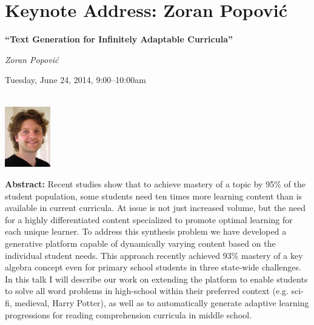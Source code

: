 \section{Keynote Address: Zoran Popović}
\begin{center}

\begin{Large}
{\bfseries\Large ``Text Generation for Infinitely Adaptable Curricula''}
\vspace{1em}\par
\end{Large}

{\itshape Zoran Popović}\vspace{1em}\par
Tuesday, June 24, 2014, 9:00--10:00am \vspace{1em}\\
\PlenaryLoc \\
\vspace{1em}\par
\includegraphics[height=100px]{content/tuesday/popovic-headshot.jpg}
\end{center}

\noindent
{\bfseries Abstract:} Recent studies show that to achieve mastery of a
topic by 95\% of the student population, some students need ten times
more learning content than is available in current curricula.  At
issue is not just increased volume, but the need for a highly
differentiated content specialized to promote optimal learning for
each unique learner.  To address this synthesis problem we have
developed a generative platform capable of dynamically varying content
based on the individual student needs.  This approach recently
achieved 93\% mastery of a key algebra concept even for primary school
students in three state-wide challenges.  In this talk I will describe
our work on extending the platform to enable students to solve all
word problems in high-school within their preferred context
(e.g. sci-fi, medieval, Harry Potter), as well as to automatically
generate adaptive learning progressions for reading comprehension
curricula in middle school.

\vspace{3em}\par 

